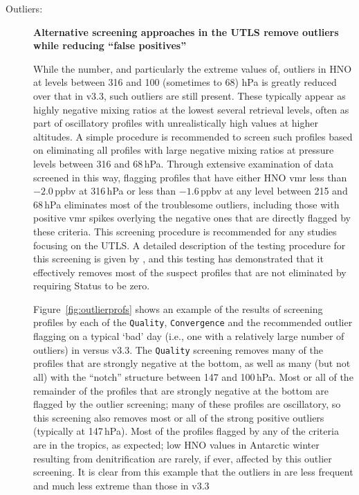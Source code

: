 \documentclass[11pt,draft]{report}
\newcommand{\screeningrule}[1]{\textbf{#1}\par}
\begin{document}
\begin{description}
\item[Outliers:] \screeningrule{Alternative screening approaches in the
    UTLS remove outliers while reducing ``false positives''} While the
  number, and particularly the extreme values of, outliers in \thisv
  HNO at levels between 316 and 100 (sometimes to 68) hPa is greatly
  reduced over that in v3.3, such outliers are still present.  These
  typically appear as highly negative mixing ratios at the lowest
  several retrieval levels, often as part of oscillatory profiles with
  unrealistically high values at higher altitudes.  A simple procedure
  is recommended to screen such profiles based on eliminating all
  profiles with large negative mixing ratios at pressure levels between
  316 and 68\,hPa.  Through extensive examination of data screened in
  this way, flagging profiles that have either HNO vmr less than
  $-2.0$\,ppbv at 316\,hPa or less than $-1.6$\,ppbv at any level
  between 215 and 68\,hPa eliminates most of the troublesome outliers,
  including those with positive vmr spikes overlying the negative ones
  that are directly flagged by these criteria.  This screening procedure
  is recommended for any studies focusing on the UTLS\@. A detailed
  description of the testing procedure for this screening is given by
  \citet{EOSMLSV33V34Quality}, and this testing has demonstrated that it
  effectively removes most of the suspect profiles that are not
  eliminated by requiring Status to be zero.

  Figure~\ref{fig:outlierprofs} shows an example of the results of
  screening profiles by each of the \texttt{Quality},
  \texttt{Conver\-gence} and the recommended outlier flagging on a
  typical `bad' day (i.e., one with a relatively large number of
  outliers) in \thisv versus v3.3.  The \texttt{Quality} screening
  removes many of the profiles that are strongly negative at the bottom,
  as well as many (but not all) with the ``notch'' structure between 147
  and 100\,hPa.  Most or all of the remainder of the profiles that are
  strongly negative at the bottom are flagged by the outlier screening;
  many of these profiles are oscillatory, so this screening also removes
  most or all of the strong positive outliers (typically at 147\,hPa).
  Most of the profiles flagged by any of the criteria are in the
  tropics, as expected; low HNO values in Antarctic winter resulting
  from denitrification are rarely, if ever, affected by this outlier
  screening. It is clear from this example that the outliers in \thisv
  are less frequent and much less extreme than those in v3.3
 
\end{description}
\end{document}
